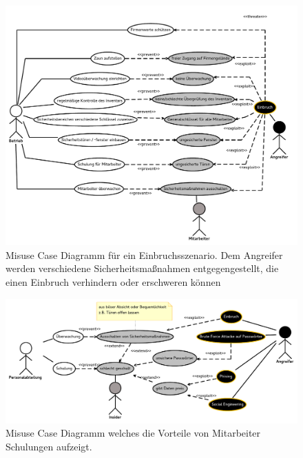 \begin{figure}[h]
\includegraphics[scale=0.8,angle=90]{images/MisUseCaseEinbruch.pdf} 
\caption{Misuse Case Diagramm für ein Einbruchsszenario. Dem Angreifer werden verschiedene Sicherheitsmaßnahmen entgegengestellt, die einen Einbruch verhindern oder erschweren können}
\end{figure}


\begin{figure}[h]
\includegraphics[scale=0.8,angle=90]{images/Schulung.pdf} 
\caption{Misuse Case Diagramm welches die Vorteile von Mitarbeiter Schulungen aufzeigt.}
\end{figure}

